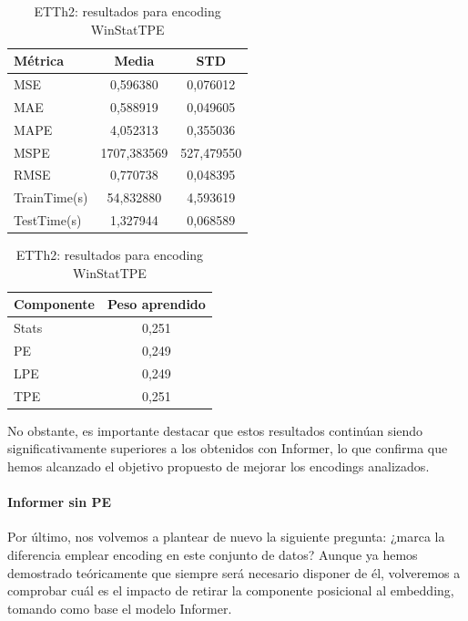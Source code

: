   \begin{table}[!ht]
 	\centering
 	\begin{minipage}{0.5\textwidth}
 		\centering
 		\begin{tabular}{l|c|c}
 			\toprule
 			Métrica & Media & STD \\
 			\midrule
 			MSE & 0,596380 & 0,076012 \\
 			MAE & 0,588919 & 0,049605 \\
 			MAPE & 4,052313 & 0,355036 \\
 			MSPE & 1707,383569 & 527,479550 \\
 			RMSE & 0,770738 & 0,048395 \\
  			TrainTime(s) & 54,832880 & 4,593619 \\
 			TestTime(s) & 1,327944 & 0,068589 \\
 			\bottomrule
 		\end{tabular}
 	\end{minipage}%
 	\hfill
 	\begin{minipage}{0.4\textwidth}
 		\centering
 		\begin{tabular}{l|c}
 			\toprule
 			Componente & Peso aprendido \\
 			\midrule
 			Stats & 0,251 \\
 			PE & 0,249 \\
 			LPE & 0,249 \\
 			TPE & 0,251 \\
 			\bottomrule
 		\end{tabular}
 	\end{minipage}
 	
 	\caption{ETTh2: resultados para encoding WinStatTPE}
 	\label{etth2tpe}
 \end{table}
 
 No obstante, es importante destacar que estos resultados continúan siendo significativamente superiores a los obtenidos con Informer, lo que confirma que hemos alcanzado el objetivo propuesto de mejorar los encodings analizados.
 
 \paragraph{Informer sin PE}
 
 Por último, nos volvemos a plantear de nuevo la siguiente pregunta: ¿marca la diferencia emplear encoding en este conjunto de datos? Aunque ya hemos demostrado teóricamente que siempre será necesario disponer de él, volveremos a comprobar cuál es el impacto de retirar la componente posicional al embedding, tomando como base el modelo Informer.\\
 
